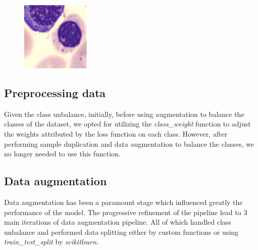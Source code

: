 \documentclass[11pt]{article}
\begin{document}
\begin{figure}[H]
\begin{minipage}{0.2\textwidth}
        \includegraphics[width=\linewidth]{images/ambiguous2.png}
    \end{minipage}
\end{figure}

\subsection{Preprocessing data}

Given the class unbalance, initially, before using augmentation to balance the classes of the dataset, we opted for utilizing the \textit{class\_weight} function to adjust the weights attributed by the loss function on each class.
However, after performing sample duplication and data augmentation to balance the classes, we no longer needed to use this function.

\subsection{Data augmentation}

Data augmentation has been a paramount stage which influenced greatly the performance of the model.
The progressive refinement of the pipeline lead to 3 main iterations of data augmentation pipeline.
All of which handled class unbalance and performed data splitting either by custom functions or using \textit{train\_test\_split} by \textit{scikit\-learn}.
\end{document}
